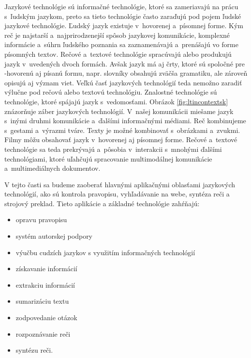 \clearpage


\begin{multicols}{2}
Jazykové technológie sú informačné technológie, ktoré
sa zameriavajú na prácu s~ľudským jazykom, preto sa tieto
technológie často zaraďujú pod pojem ľudské jazykové
technológie. Ľudský jazyk existuje v~hovorenej a~písomnej forme.
Kým reč je najstarší a~najprirodzenejší spôsob jazykovej
komunikácie, komplexné informácie a~súhrn ľudského poznania sa
zaznamenávajú a~prenášajú vo forme písomných textov. Rečové
a~textové technológie spracúvajú alebo produkujú jazyk v~uvedených
dvoch formách. Avšak jazyk má aj črty, ktoré sú spoločné pre -hovorenú aj písanú formu, napr. slovníky obsahujú zväčša gramatiku, ale 
zároveň opisujú aj význam viet. Veľkú časť
jazykových technológií teda nemožno zaradiť výlučne pod rečovú
alebo textovú technológiu. Znalostné technológie sú technológie,
ktoré spájajú jazyk s~vedomosťami. Obrázok \ref{fig:ltincontextsk}
znázorňuje záber jazykových technológií. V~našej komunikácii
miešame jazyk s~inými druhmi komunikácie a~ďalšími informačnými
médiami. Reč kombinujeme s~gestami a~výrazmi tváre. Texty je možné
kombinovať s~obrázkami a~zvukmi. Filmy môžu obsahovať jazyk
v~hovorenej aj písomnej forme. Rečové a~textové technológie sa teda
prekrývajú a~pôsobia v~interakcii s~mnohými ďalšími
technológiami, ktoré uľahčujú spracovanie multimodálnej
komunikácie a~multimediálnych dokumentov.

V tejto časti sa budeme zaoberať hlavnými aplikačnými oblasťami jazykových technológií, ako sú kontrola pravopisu, vyhľadávanie na webe, syntéza reči a strojový preklad. Tieto aplikácie a základné technológie zahŕňajú:

\begin{itemize}
\item opravu pravopisu
\item systém autorskej podpory
\item výučbu cudzích jazykov s využitím informačných technológií
\item získavanie informácií 
\item extrakciu informácií
\item sumarizáciu textu
\item zodpovedanie otázok
\item rozpoznávanie reči 
\item syntézu reči.
\end{itemize}


\end{multicols}
